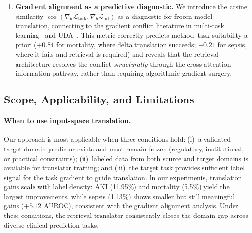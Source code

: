 \begin{enumerate}[leftmargin=*,itemsep=2pt]
\item \textbf{Gradient alignment as a predictive diagnostic.}
We introduce the cosine similarity
$\cos(\nabla_\theta \mathcal{L}_\text{task}, \nabla_\theta \mathcal{L}_\text{fid})$
as a diagnostic for frozen-model translation, connecting to the gradient conflict
literature in multi-task learning~\cite{yu2020pcgrad,liu2021cagrad} and
UDA~\cite{du2024gh,phan2024pga}.
This metric correctly predicts method--task suitability a priori
($+0.84$ for mortality, where delta translation succeeds; $-0.21$ for sepsis,
where it fails and retrieval is required) and reveals that the retrieval
architecture resolves the conflict \emph{structurally} through the cross-attention
information pathway, rather than requiring algorithmic gradient surgery.

\end{enumerate}


\subsection{Scope, Applicability, and Limitations}
\label{sec:limitations}

\paragraph{When to use input-space translation.}
Our approach is most applicable when three conditions hold:
(i)~a validated target-domain predictor exists and must remain frozen
(regulatory, institutional, or practical constraints);
(ii)~labeled data from both source and target domains is available for
translator training; and
(iii)~the target task provides sufficient label signal for the task gradient to guide translation. In our experiments, translation gains scale with label density: AKI (11.95\%) and mortality (5.5\%) yield the largest improvements, while sepsis (1.13\%) shows smaller but still meaningful gains ($+5.12$ AUROC), consistent with the gradient alignment analysis.
Under these conditions, the retrieval translator consistently closes the
domain gap across diverse clinical prediction tasks.


